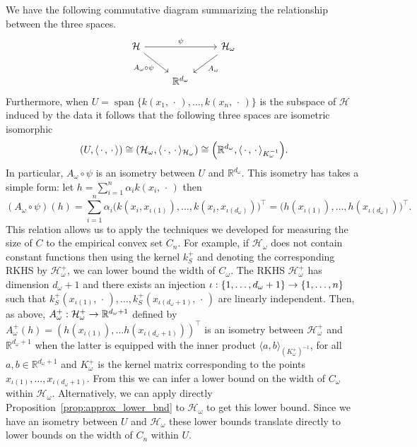 \documentclass[10pt]{amsart}
\theoremstyle{definition}\newtheorem{defi}[theo]{Definition}\newtheorem{rema}[theo]{Remark}\newtheorem{exam}[theo]{Example}\newtheorem{exem}[theo]{Example}\newtheorem{nota}[theo]{Notation}
\theoremstyle{remark}
\DeclareMathOperator{\spn}{span}
\newcommand{\R}{\mathbb{R}}
\newcommand{\cH}{\mathcal{H}}
\renewcommand*{\to}{\mathchoice{\longrightarrow}{\rightarrow}{\rightarrow}{\rightarrow}}
\let\originalleft\left
\let\originalright\right
\renewcommand{\left}{\mathopen{}\mathclose\bgroup\originalleft}
\renewcommand{\right}{\aftergroup\egroup\originalright}
\begin{document}
We have the following commutative diagram summarizing the relationship between the three spaces.
\begin{equation*}
\begin{tikzcd}
\cH \arrow{rr}{\psi} \arrow[swap]{dr}{A_\omega \circ \psi} & & \cH_\omega \arrow{dl}{A_\omega} \\
& \R^{d_\omega}
\end{tikzcd}
\end{equation*}
Furthermore, when $U = \spn\{k(x_1,\,\cdot\,), \dots, k(x_n,\,\cdot\,) \}$ is the subspace of $\cH$ induced by the data it follows that the following three spaces are isometric isomorphic
\[
(U,\langle \,\cdot\,,\,\cdot\, \rangle) \cong (\cH_\omega, \langle \,\cdot\,, \,\cdot\, \rangle_{\cH_\omega}) \cong \left(\R^{d_\omega},\langle \,\cdot\,, \,\cdot\, \rangle_{K_\omega^{-1}}\right).
\]
In particular, $A_\omega \circ \psi$ is an isometry between $U$ and $\R^{d_\omega}$. This isometry has takes a simple form: let $h = \sum_{i=1}^n \alpha_i k(x_i,\,\cdot\,)$ then
\[
(A_\omega \circ \psi)(h) = \sum_{i=1}^n \alpha_i \bigl(k(x_i,x_{\iota(1)}),\dots, k(x_i,x_{\iota(d_\omega)})\bigr)^\top = \bigl(h(x_{\iota(1)}),\dots, h(x_{\iota(d_\omega)})\bigr)^\top.
\]
This relation allows us to apply the techniques we developed for measuring the size of $C$ to the empirical convex set $C_n$. For example, if $\cH_\omega$ does not contain constant functions then using the kernel $k_S^+$ and denoting the corresponding RKHS by $\cH_\omega^+$, we can lower bound the width of $C_\omega$. The RKHS $\cH_\omega^+$ has dimension $d_\omega +1$ and there exists an injection $\iota: \{1,\dots, d_\omega+1 \} \to \{1,\dots,n\}$ such that $k_S^+(x_{\iota(1)},\,\cdot\,), \dots, k_S^+(x_{\iota(d_\omega+1)},\,\cdot\,)$ are linearly independent. Then, as above, $A_\omega^+: \cH_\omega^+ \to \R^{d_\omega +1}$ defined by $A_\omega^+(h) = (h(x_{\iota(1)}),\dots h(x_{\iota(d_\omega+1)}))^\top$ is an isometry between $\cH_\omega^+$ and $\R^{d_\omega+1}$ when the latter is equipped with the inner product $\langle a,b \rangle_{(K_\omega^+)^{-1}}$, for all $a,b \in \R^{d_\omega+1}$ and $K_\omega^+$ is the kernel matrix corresponding to the points $x_{\iota(1)},\dots, x_{\iota(d_\omega+1)}$. From this we can infer a lower bound on the width of $C_\omega$ within $\cH_\omega$. Alternatively, we can apply directly Proposition~\ref{prop:approx_lower_bnd} to $\cH_\omega$ to get this lower bound. Since we have an isometry between $U$ and $\cH_\omega$ these lower bounds translate directly to lower bounds on the width of $C_n$ within $U$.
\end{document}
